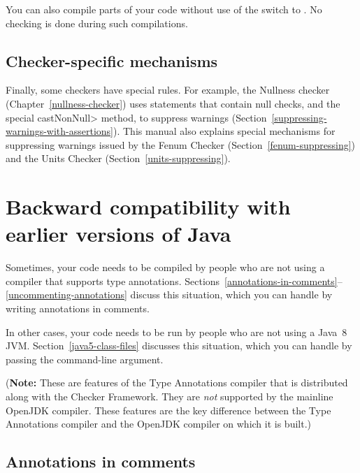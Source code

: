You can also compile parts of your code without use of the
 switch to .  No checking is done during
such compilations.

\subsection{Checker-specific mechanisms\label{checker-specific-suppression}}

Finally, some checkers have special rules.  For example, the Nullness
checker (Chapter~\ref{nullness-checker}) uses  statements that contain
null checks, and the special \<castNonNull> method, to suppress warnings
(Section~\ref{suppressing-warnings-with-assertions}).
This manual also explains special mechanisms for
suppressing warnings issued by the Fenum Checker
(Section~\ref{fenum-suppressing}) and the Units Checker
(Section~\ref{units-suppressing}).


\section{Backward compatibility with earlier versions of Java\label{backward-compatibility}}

Sometimes, your code needs to be compiled by people who are not using a
compiler that supports type annotations.
Sections~\ref{annotations-in-comments}--\ref{uncommenting-annotations}
discuss this situation, which you can handle by writing annotations in
comments.

In other cases, your code needs to be run by people who are not using a Java~8
JVM\@.  Section~\ref{java5-class-files} discusses this situation, which
you can handle by passing the  command-line argument.

(\textbf{Note:} These are features of the Type Annotations compiler that is
distributed along with the Checker Framework.  They are \emph{not}
supported by the mainline OpenJDK compiler.  These features are the key
difference between the Type Annotations compiler and the OpenJDK compiler
on which it is built.)



\subsection{Annotations in comments\label{annotations-in-comments}}

